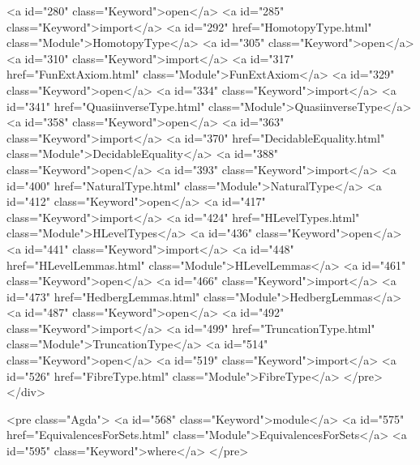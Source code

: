 <a id="280" class="Keyword">open</a> <a id="285" class="Keyword">import</a> <a id="292" href="HomotopyType.html" class="Module">HomotopyType</a>
<a id="305" class="Keyword">open</a> <a id="310" class="Keyword">import</a> <a id="317" href="FunExtAxiom.html" class="Module">FunExtAxiom</a>
<a id="329" class="Keyword">open</a> <a id="334" class="Keyword">import</a> <a id="341" href="QuasiinverseType.html" class="Module">QuasiinverseType</a>
<a id="358" class="Keyword">open</a> <a id="363" class="Keyword">import</a> <a id="370" href="DecidableEquality.html" class="Module">DecidableEquality</a>
<a id="388" class="Keyword">open</a> <a id="393" class="Keyword">import</a> <a id="400" href="NaturalType.html" class="Module">NaturalType</a>
<a id="412" class="Keyword">open</a> <a id="417" class="Keyword">import</a> <a id="424" href="HLevelTypes.html" class="Module">HLevelTypes</a>
<a id="436" class="Keyword">open</a> <a id="441" class="Keyword">import</a> <a id="448" href="HLevelLemmas.html" class="Module">HLevelLemmas</a>
<a id="461" class="Keyword">open</a> <a id="466" class="Keyword">import</a> <a id="473" href="HedbergLemmas.html" class="Module">HedbergLemmas</a>
<a id="487" class="Keyword">open</a> <a id="492" class="Keyword">import</a> <a id="499" href="TruncationType.html" class="Module">TruncationType</a>
<a id="514" class="Keyword">open</a> <a id="519" class="Keyword">import</a> <a id="526" href="FibreType.html" class="Module">FibreType</a>
</pre>
</div>

<pre class="Agda">
<a id="568" class="Keyword">module</a> <a id="575" href="EquivalencesForSets.html" class="Module">EquivalencesForSets</a> <a id="595" class="Keyword">where</a>
</pre>

